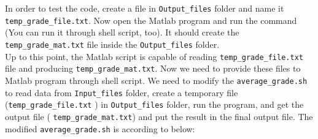\noindent
In order to test the code, create a file in \texttt{Output\_files} folder and name it \texttt{temp\_grade\_file.txt}. Now open the Matlab program and run the command (You can run it through shell script, too). It should create the \texttt{temp\_grade\_mat.txt} file inside the  \texttt{Output\_files} folder. \\
Up to this point, the Matlab script is capable of reading \texttt{temp\_grade\_file.txt} file and producing \texttt{temp\_grade\_mat.txt}. Now we need to provide these files to Matlab program through shell script. We need to modify the \texttt{average\_grade.sh} to read data from \texttt{Input\_files} folder, create a temporary file (\texttt{temp\_grade\_file.txt} ) in \texttt{Output\_files} folder, run the program, and get the output file ( \texttt{temp\_grade\_mat.txt}) and put the result in the final output file. The modified \texttt{average\_grade.sh} is according to below:\\



